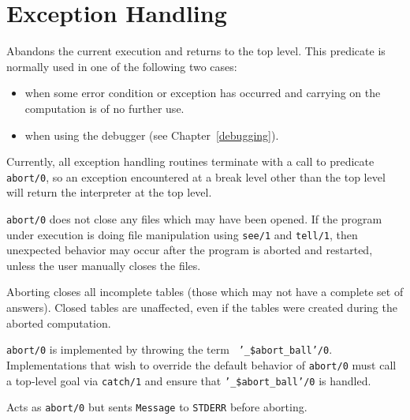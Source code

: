 


\section{Exception Handling}\label{exception}

\begin{description}

    Abandons the current execution and returns to the top level.  This
    predicate is normally used in one of the following two cases: 
    \begin{itemize} 
    \item when some error condition or exception has occurred and carrying
	  on the computation is of no further use.
    \item when using the debugger (see Chapter~\ref{debugging}).  
    \end{itemize}
    Currently, all exception handling routines terminate with a call to 
    predicate {\tt abort/0}, so an exception encountered at a break level 
    other than the top level will return the interpreter at the top level.

    {\tt abort/0} does not close any files which may have been opened.
    If the program under execution is doing file manipulation using
    {\tt see/1} and {\tt tell/1}, then unexpected behavior may occur
    after the program is aborted and restarted, unless the user
    manually closes the files.

    Aborting closes all incomplete tables (those which may not have a 
    complete set of answers).  Closed tables are unaffected, even if 
    the tables were created during the aborted computation.

    {\tt abort/0} is implemented by throwing the term {\tt
    '\_\$abort\_ball'/0}.  Implementations that wish to override the
    default behavior of {\tt abort/0} must call a top-level goal via
    {\tt catch/1} and ensure that {\tt '\_\$abort\_ball'/0} is handled.

 
    Acts as {\tt abort/0} but sents {\tt Message} to {\tt STDERR}
    before aborting.


\end{description}
